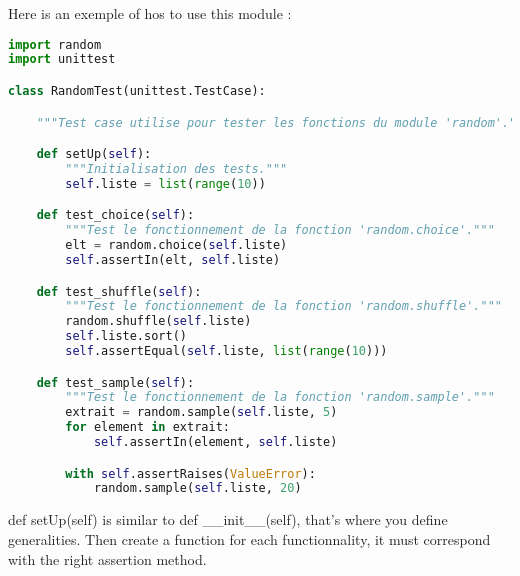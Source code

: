 \documentclass[a4paper, 12pt, titlepage]{scrartcl} %
\begin{document}
Here is an exemple of hos to use this module :
\begin{lstlisting}[language=Python]
import random
import unittest

class RandomTest(unittest.TestCase):

    """Test case utilise pour tester les fonctions du module 'random'."""

    def setUp(self):
        """Initialisation des tests."""
        self.liste = list(range(10))

    def test_choice(self):
        """Test le fonctionnement de la fonction 'random.choice'."""
        elt = random.choice(self.liste)
        self.assertIn(elt, self.liste)

    def test_shuffle(self):
        """Test le fonctionnement de la fonction 'random.shuffle'."""
        random.shuffle(self.liste)
        self.liste.sort()
        self.assertEqual(self.liste, list(range(10)))

    def test_sample(self):
        """Test le fonctionnement de la fonction 'random.sample'."""
        extrait = random.sample(self.liste, 5)
        for element in extrait:
            self.assertIn(element, self.liste)

        with self.assertRaises(ValueError):
            random.sample(self.liste, 20)
\end{lstlisting} \vspace{5mm}
def setUp(self) is similar to def \_\_init\_\_(self), that's where you define generalities.
Then create a function for each functionnality, it must correspond with the right assertion method.

\vspace{5mm}
\end{document}
